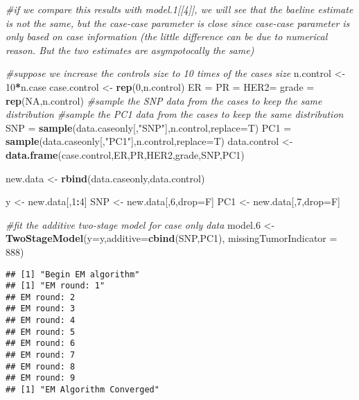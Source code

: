 \documentclass[11pt,]{article}
\newenvironment{Shaded}{\begin{snugshade}}{\end{snugshade}}
\newcommand{\CommentTok}[1]{\textcolor[rgb]{0.56,0.35,0.01}{\textit{#1}}}
\newcommand{\DataTypeTok}[1]{\textcolor[rgb]{0.13,0.29,0.53}{#1}}
\newcommand{\DecValTok}[1]{\textcolor[rgb]{0.00,0.00,0.81}{#1}}
\newcommand{\FloatTok}[1]{\textcolor[rgb]{0.00,0.00,0.81}{#1}}
\newcommand{\KeywordTok}[1]{\textcolor[rgb]{0.13,0.29,0.53}{\textbf{#1}}}
\newcommand{\NormalTok}[1]{#1}
\newcommand{\OperatorTok}[1]{\textcolor[rgb]{0.81,0.36,0.00}{\textbf{#1}}}
\newcommand{\OtherTok}[1]{\textcolor[rgb]{0.56,0.35,0.01}{#1}}
\newcommand{\StringTok}[1]{\textcolor[rgb]{0.31,0.60,0.02}{#1}}
\begin{document}
\begin{Shaded}
\begin{Highlighting}[]
\CommentTok{#if we compare this results with model.1[[4]], we will see that the baeline estimate is not the same, but the case-case parameter is close since case-case parameter is only based on case information (the little difference can be due to numerical reason. But the two estimates are asympotocally the same)}

\CommentTok{#suppose we increase the controls size to 10 times of the cases size}
\NormalTok{n.control <-}\StringTok{ }\DecValTok{10}\OperatorTok{*}\NormalTok{n.case}
\NormalTok{case.control <-}\StringTok{ }\KeywordTok{rep}\NormalTok{(}\DecValTok{0}\NormalTok{,n.control)}
\NormalTok{ER =}\StringTok{ }\NormalTok{PR =}\StringTok{ }\NormalTok{HER2=}\StringTok{ }\NormalTok{grade =}\StringTok{ }\KeywordTok{rep}\NormalTok{(}\OtherTok{NA}\NormalTok{,n.control)}
\CommentTok{#sample the SNP data from the cases to keep the same distribution}
\CommentTok{#sample the PC1 data from the cases to keep the same distribution}
\NormalTok{SNP =}\StringTok{ }\KeywordTok{sample}\NormalTok{(data.caseonly[,}\StringTok{"SNP"}\NormalTok{],n.control,}\DataTypeTok{replace=}\NormalTok{T)}
\NormalTok{PC1 =}\StringTok{ }\KeywordTok{sample}\NormalTok{(data.caseonly[,}\StringTok{"PC1"}\NormalTok{],n.control,}\DataTypeTok{replace=}\NormalTok{T)}
\NormalTok{data.control <-}\StringTok{ }\KeywordTok{data.frame}\NormalTok{(case.control,ER,PR,HER2,grade,SNP,PC1)}

\NormalTok{new.data <-}\StringTok{ }\KeywordTok{rbind}\NormalTok{(data.caseonly,data.control)}

\NormalTok{y <-}\StringTok{ }\NormalTok{new.data[,}\DecValTok{1}\OperatorTok{:}\DecValTok{4}\NormalTok{]}
\NormalTok{SNP <-}\StringTok{ }\NormalTok{new.data[,}\DecValTok{6}\NormalTok{,drop=F]}
\NormalTok{PC1 <-}\StringTok{ }\NormalTok{new.data[,}\DecValTok{7}\NormalTok{,drop=F]}

\CommentTok{#fit the additive two-stage model for case only data}
\NormalTok{model}\FloatTok{.6}\NormalTok{ <-}\StringTok{ }\KeywordTok{TwoStageModel}\NormalTok{(}\DataTypeTok{y=}\NormalTok{y,}\DataTypeTok{additive=}\KeywordTok{cbind}\NormalTok{(SNP,PC1),}
                         \DataTypeTok{missingTumorIndicator =} \DecValTok{888}\NormalTok{)}
\end{Highlighting}
\end{Shaded}

\begin{verbatim}
## [1] "Begin EM algorithm"
## [1] "EM round: 1"
## EM round: 2
## EM round: 3
## EM round: 4
## EM round: 5
## EM round: 6
## EM round: 7
## EM round: 8
## EM round: 9
## [1] "EM Algorithm Converged"
\end{verbatim}
\end{document}
